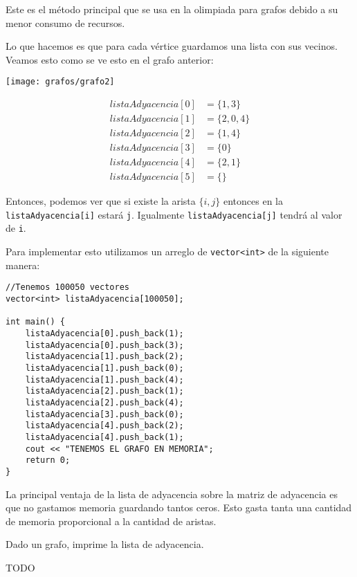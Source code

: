 Este es el método principal que se usa en la olimpiada para grafos debido a su menor consumo de recursos.

Lo que hacemos es que para cada vértice guardamos una lista con sus vecinos. Veamos esto como se ve esto en el grafo anterior:
\begin{center}
	\texttt{[image: grafos/grafo2]}
\end{center}


{
\begin{align*}
listaAdyacencia[0] & =\{1,3\} \\
listaAdyacencia[1] & =\{2,0,4\}\\
listaAdyacencia[2] & =\{1,4\}\\
listaAdyacencia[3] & =\{0\}\\
listaAdyacencia[4] & =\{2,1\}\\
listaAdyacencia[5] & =\{ \}		
\end{align*}
}

Entonces, podemos ver que si existe la arista \(\{i,j\}\) entonces en la \verb|listaAdyacencia[i]| estará \verb|j|. Igualmente \verb|listaAdyacencia[j]| tendrá al valor de \verb|i|.

Para implementar esto utilizamos un arreglo de \lstinline|vector<int>| de la siguiente manera:

\begin{minipage}{\linewidth}
\begin{lstlisting}
//Tenemos 100050 vectores
vector<int> listaAdyacencia[100050];

int main() {
	listaAdyacencia[0].push_back(1);
	listaAdyacencia[0].push_back(3);
	listaAdyacencia[1].push_back(2);
	listaAdyacencia[1].push_back(0);
	listaAdyacencia[1].push_back(4);
	listaAdyacencia[2].push_back(1);
	listaAdyacencia[2].push_back(4);
	listaAdyacencia[3].push_back(0);
	listaAdyacencia[4].push_back(2);
	listaAdyacencia[4].push_back(1);
	cout << "TENEMOS EL GRAFO EN MEMORIA";
	return 0;
}
\end{lstlisting}
\end{minipage}

La principal ventaja de la lista de adyacencia sobre la matriz de adyacencia es que no gastamos memoria guardando tantos ceros. Esto gasta tanta una cantidad de memoria proporcional a la cantidad de aristas.

\begin{exercise}
	Dado un grafo, imprime la lista de adyacencia.
	
	TODO
\end{exercise}

